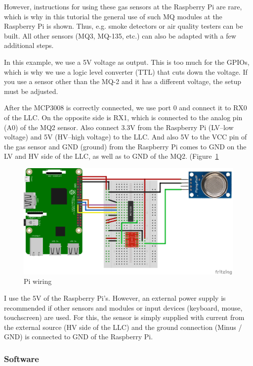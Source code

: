 \documentclass{article}\usepackage[]{graphicx}\usepackage[]{color}
\begin{document}
However, instructions for using these gas sensors at the Raspberry Pi are rare, which is why in this tutorial the general use of such MQ modules at the Raspberry Pi is shown. Thus, e.g. smoke detectors or air quality testers can be built. All other sensors (MQ3, MQ-135, etc.) can also be adapted with a few additional steps.

In this example, we use a 5V voltage as output. This is too much for the GPIOs, which is why we use a logic level converter (TTL) that cuts down the voltage. If you use a sensor other than the MQ-2 and it has a different voltage, the setup must be adjusted.

After the MCP3008 is correctly connected, we use port 0 and connect it to RX0 of the LLC. On the opposite side is RX1, which is connected to the analog pin (A0) of the MQ2 sensor. Also connect 3.3V from the Raspberry Pi (LV--low voltage) and 5V (HV--high voltage) to the LLC. And also 5V to the VCC pin of the gas sensor and GND (ground) from the Raspberry Pi comes to GND on the LV and HV side of the LLC, as well as to GND of the MQ2. (Figure~\ref{fig:Pi-MQ2}

\begin{figure}
\includegraphics[width=1.00\textwidth]{Raspberry-Pi-Gas-Sensor-MQ2.png}
\caption{Pi wiring}
\label{fig:Pi-MQ2}
\end{figure}

I use the 5V of the Raspberry Pi's. However, an external power supply is recommended if other sensors and modules or input devices (keyboard, mouse, touchscreen) are used. For this, the sensor is simply supplied with current from the external source (HV side of the LLC) and the ground connection (Minus / GND) is connected to GND of the Raspberry Pi.



\subsubsection{Software}
\end{document}
